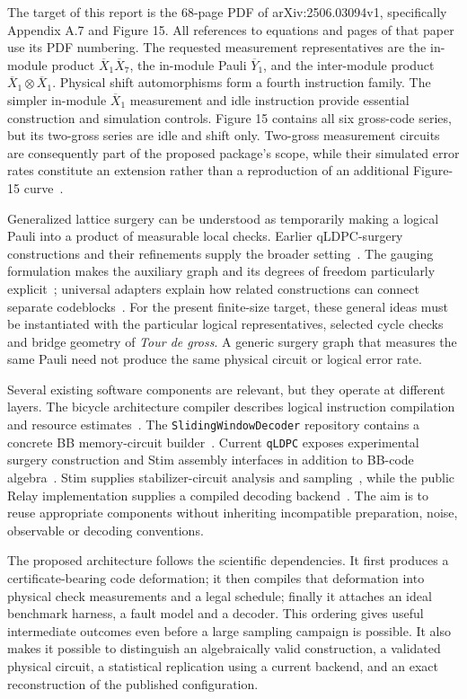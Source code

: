 \documentclass[11pt,a4paper]{article}
\newcommand{\lx}{\overline{X}}
\newcommand{\ly}{\overline{Y}}
\begin{document}
The target of this report is the 68-page PDF of arXiv:2506.03094v1, specifically Appendix A.7 and Figure 15. All references to equations and pages of that paper use its PDF numbering. The requested measurement representatives are the in-module product $\lx_1\lx_7$, the in-module Pauli $\ly_1$, and the inter-module product $\lx_1\otimes\lx_1$. Physical shift automorphisms form a fourth instruction family. The simpler in-module $\lx_1$ measurement and idle instruction provide essential construction and simulation controls. Figure 15 contains all six gross-code series, but its two-gross series are idle and shift only. Two-gross measurement circuits are consequently part of the proposed package's scope, while their simulated error rates constitute an extension rather than a reproduction of an additional Figure-15 curve~\cite{tdg}.

Generalized lattice surgery can be understood as temporarily making a logical Pauli into a product of measurable local checks. Earlier qLDPC-surgery constructions and their refinements supply the broader setting~\cite{cohen,cross}. The gauging formulation makes the auxiliary graph and its degrees of freedom particularly explicit~\cite{gauging}; universal adapters explain how related constructions can connect separate codeblocks~\cite{adapters}. For the present finite-size target, these general ideas must be instantiated with the particular logical representatives, selected cycle checks and bridge geometry of \emph{Tour de gross}. A generic surgery graph that measures the same Pauli need not produce the same physical circuit or logical error rate.

Several existing software components are relevant, but they operate at different layers. The bicycle architecture compiler describes logical instruction compilation and resource estimates~\cite{compiler}. The \texttt{SlidingWindowDecoder} repository contains a concrete BB memory-circuit builder~\cite{swd}. Current \texttt{qLDPC} exposes experimental surgery construction and Stim assembly interfaces in addition to BB-code algebra~\cite{qldpc}. Stim supplies stabilizer-circuit analysis and sampling~\cite{stim}, while the public Relay implementation supplies a compiled decoding backend~\cite{relay,relaysoftware}. The aim is to reuse appropriate components without inheriting incompatible preparation, noise, observable or decoding conventions.

The proposed architecture follows the scientific dependencies. It first produces a certificate-bearing code deformation; it then compiles that deformation into physical check measurements and a legal schedule; finally it attaches an ideal benchmark harness, a fault model and a decoder. This ordering gives useful intermediate outcomes even before a large sampling campaign is possible. It also makes it possible to distinguish an algebraically valid construction, a validated physical circuit, a statistical replication using a current backend, and an exact reconstruction of the published configuration.
\end{document}
